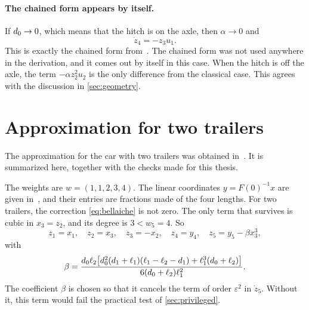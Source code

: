 \paragraph{The chained form appears by itself.}
If $d_0\to0$, which means that the hitch is on the axle, then $\alpha\to0$ and
\begin{equation}
  \dot z_4=-z_3u_1 .
\end{equation}
This is exactly the chained form from~\cite{sordalen1993}. The chained form was
not used anywhere in the derivation, and it comes out by itself in this case.
When the hitch is off the axle, the term $-\alpha z_2^2u_2$ is the only
difference from the classical case. This agrees with the discussion in
\cref{sec:geometry}.

\section{Approximation for two trailers}
\label{sec:approx2}

The approximation for the car with two trailers was obtained
in~\cite{zuyev2024}. It is summarized here, together with the checks made for
this thesis.

The weights are $w=(1,1,2,3,4)$. The linear coordinates $y=F(0)^{-1}x$ are given
in~\cite{zuyev2024}, and their entries are fractions made of the four lengths.
For two trailers, the correction \eqref{eq:bellaiche} is not zero. The only term
that survives is cubic in $x_3=z_2$, and its degree is $3<w_5=4$. So
\begin{equation}
  z_1=x_1,\quad z_2=x_3,\quad z_3=-x_2,\quad z_4=y_4,\quad
  z_5=y_5-\beta x_3^{3},
  \label{eq:xtoz2}
\end{equation}
with
\begin{equation}
  \beta=\frac{d_0\ell_2\bigl[d_0^{2}(d_1+\ell_1)(\ell_1-\ell_2-d_1)
        +\ell_1^{3}(d_0+\ell_2)\bigr]}{6(d_0+\ell_2)\ell_1^{2}} .
\end{equation}
The coefficient $\beta$ is chosen so that it cancels the term of order
$\varepsilon^2$ in $\dot z_5$. Without it, this term would fail the practical test
of \cref{sec:privileged}.


